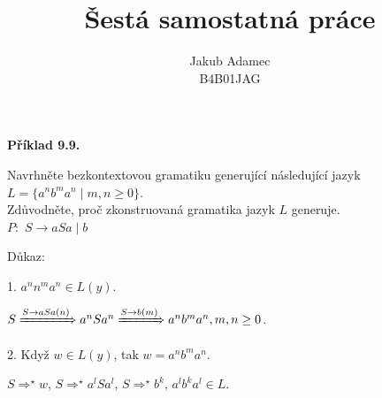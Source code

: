 \documentclass[11pt]{article}
\begin{document}

\newcommand\splitpage[2]{
      \begin{minipage}[t]{0.45\textwidth}#1
      \end{minipage}%
      \hfill
      \begin{minipage}[t]{0.45\textwidth}#2
      \end{minipage}
}
 
 
\title{\textbf{Šestá samostatná práce}}
\author{Jakub Adamec\\ %
B4B01JAG} %

\maketitle

\noindent
\textbf{Příklad 9.9.} 

Navrhněte bezkontextovou gramatiku generující následující jazyk ${L = \{a^n b^m a^n \mid m, n \geq 0\}}$.\\
Zdůvodněte, proč zkonstruovaná gramatika jazyk $L$ generuje.\\

$P: $
$S \rightarrow aSa \mid b$

Důkaz:
\\

\splitpage{

1. $a^n n^m a^n \in L(y)$.

${S \xRightarrow{S \rightarrow a S a (n)} a^n S a^n \xRightarrow{S \rightarrow b (m)} a^n b^m a^n, m,n \geq 0}$.
}{

2. Když $w \in L(y)$, tak $w = a^n b^m a^n$.

$S \Rightarrow^\star w$, $S \Rightarrow^\star a^l S a^l$, $S \Rightarrow^\star b^k$, $a^l b^k a^l \in L$.

}
\\
\\
\\
\end{document}
